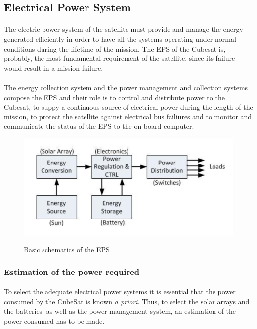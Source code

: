 \subsection{Electrical Power System}

\paragraph{}The electric power system of the satellite must provide and manage the energy generated efficiently in order to have all the systems operating under normal conditions during the lifetime of the mission. The EPS of the Cubesat is, probably, the most fundamental requirement of the satellite, since its failure would result in a mission failure. 

\paragraph{}The energy collection system and the power management and  collection systems compose the EPS and their role is to control and distribute power to the Cubesat, to suppy a continuous source of electrical power during the length of the mission, to protect the satellite against electrical bus failiures and to monitor and communicate the status of the EPS to the on-board computer.

\begin{figure}[h]
\includegraphics[scale=0.6]{./sections/SatelliteDept/sections/images/epsbasics}
\centering
\caption{Basic schematics of the EPS} 
\cite{epsbasics}
\end{figure}

\subsubsection{Estimation of the power required}
\paragraph{}To select the adequate electrical power systems it is essential that the power consumed by the CubeSat is known \textit{a priori}. Thus, to select the solar arrays and the batteries, as well as the power management system, an estimation of the power consumed has to be made.

